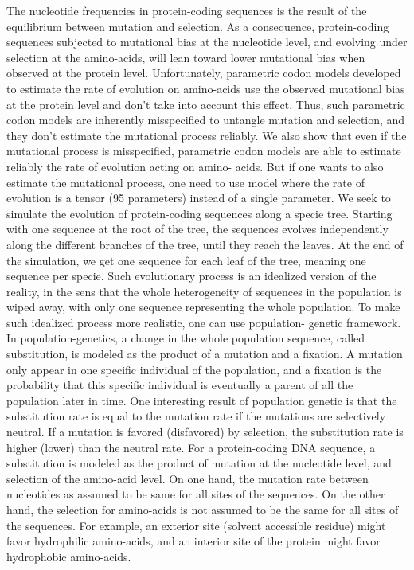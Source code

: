 The nucleotide frequencies in protein-coding sequences is the result of the equilibrium between mutation and
selection. As a consequence, protein-coding sequences subjected to mutational bias at the nucleotide level,
and evolving under selection at the amino-acids, will lean toward lower mutational bias when observed at
the protein level. Unfortunately, parametric \gls{codon} models developed to estimate the rate of evolution on
amino-acids use the observed mutational bias at the protein level and don’t take into account this effect.
Thus, such parametric \gls{codon} models are inherently misspecified to untangle mutation and selection, and
they don’t estimate the mutational process reliably. We also show that even if the mutational process is
misspecified, parametric \gls{codon} models are able to estimate reliably the rate of evolution acting on amino-
acids. But if one wants to also estimate the mutational process, one need to use model where the rate of
evolution is a tensor (95 parameters) instead of a single parameter.
We seek to simulate the evolution of protein-coding sequences along a specie tree. Starting with one
sequence at the root of the tree, the sequences evolves independently along the different branches of the
tree, until they reach the leaves. At the end of the simulation, we get one sequence for each leaf of the
tree, meaning one sequence per specie. Such evolutionary process is an idealized version of the reality, in
the sens that the whole heterogeneity of sequences in the population is wiped away, with only one sequence
representing the whole population. To make such idealized process more realistic, one can use population-
genetic framework. In population-genetics, a change in the whole population sequence, called \gls{substitution},
is modeled as the product of a mutation and a fixation. A mutation only appear in one specific individual of
the population, and a fixation is the probability that this specific individual is eventually a parent of all the
population later in time. One interesting result of population genetic is that the \gls{substitution} rate is equal to
the mutation rate if the mutations are selectively \gls{neutral}. If a mutation is favored (disfavored) by selection,
the \gls{substitution} rate is higher (lower) than the \gls{neutral} rate.
For a protein-coding \acrshort{DNA} sequence, a \gls{substitution} is modeled as the product of mutation at the nucleotide
level, and selection of the amino-acid level. On one hand, the mutation rate between nucleotides as assumed
to be same for all sites of the sequences. On the other hand, the selection for amino-acids is not assumed
to be the same for all sites of the sequences. For example, an exterior site (solvent accessible residue) might
favor hydrophilic amino-acids, and an interior site of the protein might favor hydrophobic amino-acids.


